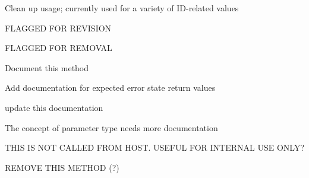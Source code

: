 \begin{DoxyRefList}
%
Clean up usage; currently used for a variety of ID-\/related values  
\item[Member \mbox{\hyperlink{a00503_aa5ffa1ed828630b6b7a13c049d93ae87}{AAX\+\_\+\+EParameter\+Orientation\+Bits}} ]\label{a00800__todo000029}%
%
FLAGGED FOR REVISION 
\item[Member \mbox{\hyperlink{a00503_ace1a00189fa05277582cfb1e8ad48014}{AAX\+\_\+\+EParameter\+Type}} ]\label{a00800__todo000028}%
%
FLAGGED FOR REMOVAL 
\item[Member \mbox{\hyperlink{a01949_a3922a4b9fef09e88440d7655422c2b96}{AAX\+\_\+\+IACFEffect\+GUI\+::Set\+Control\+Highlight\+Info}} (AAX\+\_\+\+CParam\+ID i\+Parameter\+ID, AAX\+\_\+\+CBoolean i\+Is\+Highlighted, AAX\+\_\+\+EHighlight\+Color i\+Color)=0]\label{a00800__todo000030}%
%
Document this method 
\item[Class \mbox{\hyperlink{a01953}{AAX\+\_\+\+IACFEffect\+Parameters}} ]\label{a00800__todo000031}%
%
Add documentation for expected error state return values 
\item[Member \mbox{\hyperlink{a01953_ac122e1a693296b059dca4350a5ff1dfe}{AAX\+\_\+\+IACFEffect\+Parameters\+::Get\+Parameter\+Orientation}} (AAX\+\_\+\+CParam\+ID i\+Parameter\+ID, AAX\+\_\+\+EParameter\+Orientation $\ast$o\+Parameter\+Orientation) const =0]\label{a00800__todo000038}%
%
update this documentation 
\item[Member \mbox{\hyperlink{a01953_ae7f6d803fa9a472a4bad583868e3b951}{AAX\+\_\+\+IACFEffect\+Parameters\+::Get\+Parameter\+Type}} (AAX\+\_\+\+CParam\+ID i\+Parameter\+ID, AAX\+\_\+\+EParameter\+Type $\ast$o\+Parameter\+Type) const =0]\label{a00800__todo000037}%
%
The concept of parameter type needs more documentation 
\item[Member \mbox{\hyperlink{a01953_a333b83bc6f37b0103ce0de65be02fede}{AAX\+\_\+\+IACFEffect\+Parameters\+::Set\+Parameter\+Default\+Normalized\+Value}} (AAX\+\_\+\+CParam\+ID i\+Parameter\+ID, double i\+Value)=0]\label{a00800__todo000036}%
%
THIS IS NOT CALLED FROM HOST. USEFUL FOR INTERNAL USE ONLY? 
\item[Member \mbox{\hyperlink{a01953_a6e28a427a0d7d0c8df69dd5eb88cff6c}{AAX\+\_\+\+IACFEffect\+Parameters\+::Set\+Parameter\+Normalized\+Relative}} (AAX\+\_\+\+CParam\+ID i\+Parameter\+ID, double i\+Value)=0]\label{a00800__todo000039}%
%
REMOVE THIS METHOD (?)


\end{DoxyRefList}

